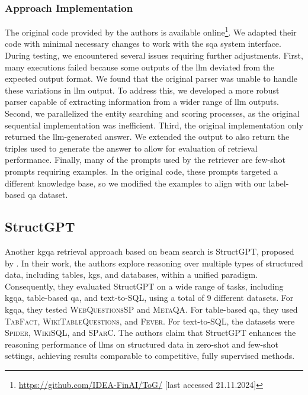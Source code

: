 \subsubsection{Approach Implementation} 
The original code provided by the authors is available online\footnote{\url{https://github.com/IDEA-FinAI/ToG/} [last accessed 21.11.2024]}. We adapted their code with minimal necessary changes to work with the \gls{sqa} system interface. During testing, we encountered several issues requiring further adjustments. First, many executions failed because some outputs of the \gls{llm} deviated from the expected output format. We found that the original parser was unable to handle these variations in \gls{llm} output. To address this, we developed a more robust parser capable of extracting information from a wider range of \gls{llm} outputs. Second, we parallelized the entity searching and scoring processes, as the original sequential implementation was inefficient. Third, the original implementation only returned the \gls{llm}-generated answer. We extended the output to also return the triples used to generate the answer to allow for evaluation of retrieval performance. Finally, many of the prompts used by the retriever are few-shot prompts requiring examples. In the original code, these prompts targeted a different knowledge base, so we modified the examples to align with our label-based \gls{qa} dataset.


\subsection{StructGPT}
Another \gls{kgqa} retrieval approach based on beam search is StructGPT, proposed by \textcite{jiang_structgpt_2023}. In their work, the authors explore reasoning over multiple types of structured data, including tables, \glspl{kg}, and databases, within a unified paradigm. Consequently, they evaluated StructGPT on a wide range of tasks, including \gls{kgqa}, table-based \gls{qa}, and text-to-SQL, using a total of 9 different datasets. For \gls{kgqa}, they tested \textsc{WebQuestionsSP} and \textsc{MetaQA}. For table-based \gls{qa}, they used \textsc{TabFact}, \textsc{WikiTableQuestions}, and \textsc{Fever}. For text-to-SQL, the datasets were \textsc{Spider}, \textsc{WikiSQL}, and \textsc{SParC}. The authors claim that StructGPT enhances the reasoning performance of \glspl{llm} on structured data in zero-shot and few-shot settings, achieving results comparable to competitive, fully supervised methods. 

